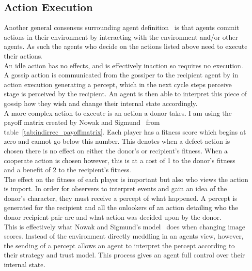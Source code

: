 \documentclass[]{final_report}
\begin{document}
\subsection{Action Execution}
\label{subs:execution}
Another general consensus surrounding agent definition~\cite{franklin1996agent} is that agents commit actions in their environment by interacting with the environment and/or other agents. As such the agents who decide on the actions listed above need to execute their actions.\\
An idle action has no effects, and is effectively inaction so requires no execution. A gossip action is communicated from the gossiper to the recipient agent by in action execution generating a percept, which in the next cycle steps perceive stage is perceived by the recipient. An agent is then able to interpret this piece of gossip how they wish and change their internal state accordingly.\\
A more complex action to execute is an action a donor takes. I am using the payoff matrix created by Nowak and Sigmund~\cite{evol_indirect_image} from table~\ref{tab:indirrec_payoffmatrix}. Each player has a fitness score which begins at zero and cannot go below this number. This denotes when a defect action is chosen there is no effect on either the donor's or recipient's fitness. When a cooperate action is chosen however, this is at a cost of 1 to the donor's fitness and a benefit of 2 to the recipient's fitness.\\
The effect on the fitness of each player is important but also who views the action is import. In order for observers to interpret events and gain an idea of the donor's character, they must receive a percept of what happened. A percept is generated for the recipient and all the onlookers of an action detailing who the donor-recipient pair are and what action was decided upon by the donor.\\
This is effectively what Nowak and Sigmund's model~\cite{evol_indirect_image} does when changing image scores. Instead of the environment directly meddling in an agents view, however, the sending of a percept allows an agent to interpret the percept according to their strategy and trust model. This process gives an agent full control over their internal state.
\end{document}
